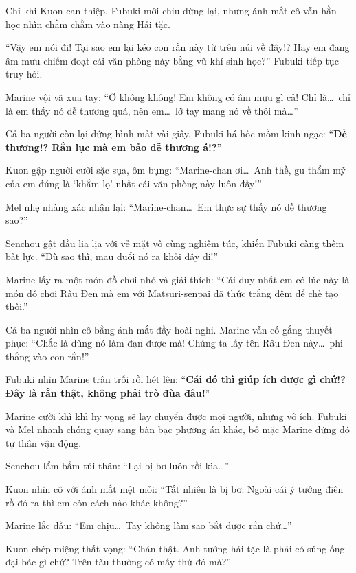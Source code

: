 \documentclass[../main.tex]{subfiles}
\begin{document}
Chỉ khi Kuon can thiệp, Fubuki mới chịu dừng lại, nhưng ánh mắt cô vẫn hằn học nhìn chằm chằm vào nàng Hải tặc.

``Vậy em nói đi! Tại sao em lại kéo con rắn này từ trên núi về đây!? Hay em đang âm mưu chiếm đoạt cái văn phòng này bằng vũ khí sinh học?'' Fubuki tiếp tục truy hỏi.

Marine vội vã xua tay: ``Ơ không không! Em không có âm mưu gì cả! Chỉ là\dots\ chỉ là em thấy nó dễ thương quá, nên em\dots\ lỡ tay mang nó về thôi mà\dots''

Cả ba người còn lại đứng hình mất vài giây. Fubuki há hốc mồm kinh ngạc: ``\textbf{Dễ thương!? Rắn lục mà em bảo dễ thương á!?}''

Kuon gập người cười sặc sụa, ôm bụng: ``Marine-chan ơi\dots\ Anh thề, gu thẩm mỹ của em đúng là `khắm lọ' nhất cái văn phòng này luôn đấy!''

Mel nhẹ nhàng xác nhận lại: ``Marine-chan\dots\ Em thực sự thấy nó dễ thương sao?''

Senchou gật đầu lia lịa với vẻ mặt vô cùng nghiêm túc, khiến Fubuki càng thêm bất lực. ``Dù sao thì, mau đuổi nó ra khỏi đây đi!''

Marine lấy ra một món đồ chơi nhỏ và giải thích: ``Cái duy nhất em có lúc này là món đồ chơi Râu Đen mà em với Matsuri-senpai đã thức trắng đêm để chế tạo thôi.''


Cả ba người nhìn cô bằng ánh mắt đầy hoài nghi. Marine vẫn cố gắng thuyết phục: ``Chắc là dùng nó làm đạn được mà! Chúng ta lấy tên Râu Đen này\dots\ phi thẳng vào con rắn!''

Fubuki nhìn Marine trân trối rồi hét lên: ``\textbf{Cái đó thì giúp ích được gì chứ!? Đây là rắn thật, không phải trò đùa đâu!}''

Marine cười khì khì hy vọng sẽ lay chuyển được mọi người, nhưng vô ích. Fubuki và Mel nhanh chóng quay sang bàn bạc phương án khác, bỏ mặc Marine đứng đó tự thân vận động.

Senchou lẩm bẩm tủi thân: ``Lại bị bơ luôn rồi kìa\dots''

Kuon nhìn cô với ánh mắt mệt mỏi: ``Tất nhiên là bị bơ. Ngoài cái ý tưởng điên rồ đó ra thì em còn cách nào khác không?''

Marine lắc đầu: ``Em chịu\dots\ Tay không làm sao bắt được rắn chứ\dots''

Kuon chép miệng thất vọng: ``Chán thật. Anh tưởng hải tặc là phải có súng ống đại bác gì chứ? Trên tàu thường có mấy thứ đó mà?''
\end{document}
